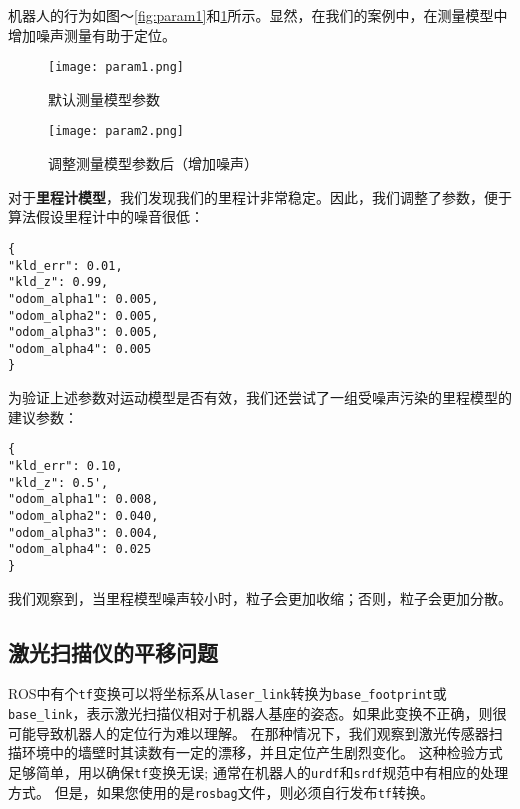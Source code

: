 机器人的行为如图〜\ref{fig:param1}和\ref{fig:param2}所示。显然，在我们的案例中，在测量模型中增加噪声测量有助于定位。

\begin{figure}[!tb]
	\texttt{[image: param1.png]}
	\caption{默认测量模型参数}%
	\label{fig:param1}
	\endminipage\hfill
	\texttt{[image: param2.png]}
	\caption{调整测量模型参数后（增加噪声）}%
	\label{fig:param2}
	\endminipage\hfill
\end{figure}

对于\textbf{里程计模型}，我们发现我们的里程计非常稳定。因此，我们调整了参数，便于算法假设里程计中的噪音很低：

\begin{verbatim}
{   
"kld_err": 0.01,
"kld_z": 0.99,
"odom_alpha1": 0.005,
"odom_alpha2": 0.005,
"odom_alpha3": 0.005,
"odom_alpha4": 0.005
}
\end{verbatim}

为验证上述参数对运动模型是否有效，我们还尝试了一组受噪声污染的里程模型的建议参数：
\begin{verbatim}
{
"kld_err": 0.10,
"kld_z": 0.5',                                                                            
"odom_alpha1": 0.008,                                                                     
"odom_alpha2": 0.040,                                                                     
"odom_alpha3": 0.004,                                                                     
"odom_alpha4": 0.025                                                                      
} 
\end{verbatim}

我们观察到，当里程模型噪声较小时，粒子会更加收缩；否则，粒子会更加分散。

\subsection[Translation of the laser scanner]{激光扫描仪的平移问题}

ROS中有个\texttt{tf}变换可以将坐标系从\texttt{laser_link}转换为\texttt{base_footprint}或\texttt{base_link}，表示激光扫描仪相对于机器人基座的姿态。如果此变换不正确，则很可能导致机器人的定位行为难以理解。
在那种情况下，我们观察到激光传感器扫描环境中的墙壁时其读数有一定的漂移，并且定位产生剧烈变化。
这种检验方式足够简单，用以确保\texttt{tf}变换无误;
通常在机器人的\texttt{urdf}和\texttt{srdf}规范中有相应的处理方式。
但是，如果您使用的是\texttt{rosbag}文件，则必须自行发布\texttt{tf}转换。

